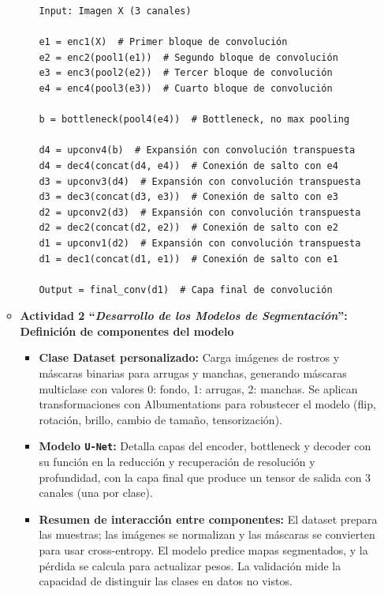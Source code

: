 \begin{enumerate}
\begin{itemize}
\begin{itemize}
\begin{verbatim}
Input: Imagen X (3 canales)

e1 = enc1(X)  # Primer bloque de convolución
e2 = enc2(pool1(e1))  # Segundo bloque de convolución
e3 = enc3(pool2(e2))  # Tercer bloque de convolución
e4 = enc4(pool3(e3))  # Cuarto bloque de convolución

b = bottleneck(pool4(e4))  # Bottleneck, no max pooling

d4 = upconv4(b)  # Expansión con convolución transpuesta
d4 = dec4(concat(d4, e4))  # Conexión de salto con e4
d3 = upconv3(d4)  # Expansión con convolución transpuesta
d3 = dec3(concat(d3, e3))  # Conexión de salto con e3
d2 = upconv2(d3)  # Expansión con convolución transpuesta
d2 = dec2(concat(d2, e2))  # Conexión de salto con e2
d1 = upconv1(d2)  # Expansión con convolución transpuesta
d1 = dec1(concat(d1, e1))  # Conexión de salto con e1

Output = final_conv(d1)  # Capa final de convolución
\end{verbatim}

\end{itemize}



  \item\textbf{Actividad 2 “\textit{Desarrollo de los Modelos de Segmentación}”: Definición de componentes del modelo}
  \begin{itemize}
    \item \textbf{Clase Dataset personalizado:} Carga imágenes de rostros y máscaras binarias para arrugas y manchas, generando máscaras multiclase con valores {0: fondo, 1: arrugas, 2: manchas}. Se aplican transformaciones con Albumentations para robustecer el modelo (flip, rotación, brillo, cambio de tamaño, tensorización).
    \item \textbf{Modelo \texttt{U-Net}:} Detalla capas del encoder, bottleneck y decoder con su función en la reducción y recuperación de resolución y profundidad, con la capa final que produce un tensor de salida con 3 canales (una por clase).
    \item \textbf{Resumen de interacción entre componentes:} El dataset prepara las muestras; las imágenes se normalizan y las máscaras se convierten para usar cross-entropy. El modelo predice mapas segmentados, y la pérdida se calcula para actualizar pesos. La validación mide la capacidad de distinguir las clases en datos no vistos.
  \end{itemize}
\end{itemize}


\end{enumerate}
